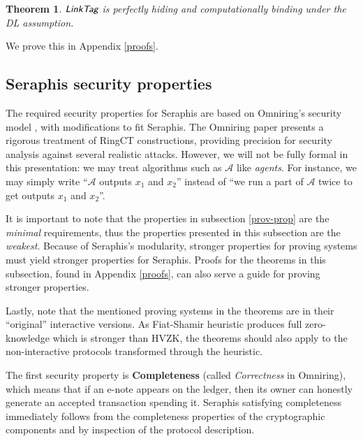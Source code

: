 \documentclass{article}
\newtheorem{theorem}{Theorem}[section]
\begin{document}
\begin{theorem}\label{thm-linktag}
$\emph{\textsf{LinkTag}}$ is perfectly hiding and computationally binding under the DL assumption.
\end{theorem}
\noindent We prove this in Appendix \ref{proofs}.

\subsection{Seraphis security properties}\label{sec-thm}
The required security properties for Seraphis are based on Omniring's security model \cite{omniring}, with modifications to fit Seraphis. The Omniring paper presents a rigorous treatment of RingCT constructions, providing precision for security analysis against several realistic attacks. However, we will not be fully formal in this presentation: we may treat algorithms such as $\mathcal{A}$ like \textit{agents}. For instance, we may simply write ``$\mathcal{A}$ outputs $x_1$ and $x_2$'' instead of ``we run a part of $\mathcal{A}$ twice to get outputs $x_1$ and $x_2$''.

It is important to note that the properties in subsection \ref{prov-prop} are the \textit{minimal} requirements, thus the properties presented in this subsection are the \textit{weakest}. Because of Seraphis's modularity, stronger properties for proving systems must yield stronger properties for Seraphis. Proofs for the theorems in this subsection, found in Appendix \ref{proofs}, can also serve a guide for proving stronger properties.

Lastly, note that the mentioned proving systems in the theorems are in their ``original'' interactive versions. As Fiat-Shamir heuristic produces full zero-knowledge which is stronger than HVZK, the theorems should also apply to the non-interactive protocols transformed through the heuristic.

The first security property is \textbf{Completeness} (called \textit{Correctness} in Omniring), which means that if an e-note appears on the ledger, then its owner can honestly generate an accepted transaction spending it. Seraphis satisfying completeness immediately follows from the completeness properties of the cryptographic components and by inspection of the protocol description.
\end{document}

